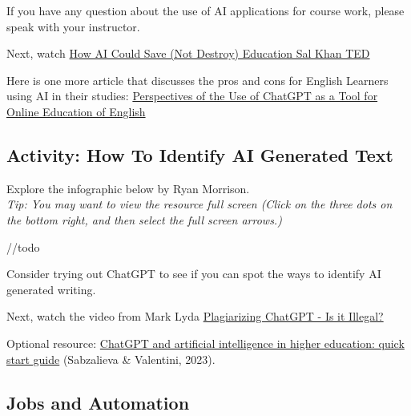 \documentclass[
]{book}
\theoremstyle{definition}
\theoremstyle{definition}
\theoremstyle{definition}
\theoremstyle{definition}
\theoremstyle{remark}
\begin{document}
\begin{reflect}
If you have any question about the use of AI applications for course work, please speak with your instructor.

Next, watch \href{https://www.youtube.com/watch?v=hJP5GqnTrNo}{How AI Could Save (Not Destroy) Education \textbar{} Sal Khan \textbar{} TED}

Here is one more article that discusses the pros and cons for English Learners using AI in their studies: \href{https://www.researchgate.net/publication/374483468_Perspectives_of_the_Use_of_ChatGPT_as_a_Tool_for_Online_Education_of_English}{Perspectives of the Use of ChatGPT as a Tool for Online Education of English}
\end{reflect}

\hypertarget{activity-how-to-identify-ai-generated-text}{%
\subsection*{Activity: How To Identify AI Generated Text}\label{activity-how-to-identify-ai-generated-text}}

\begin{reflect}
Explore the infographic below by Ryan Morrison.\\
\emph{Tip: You may want to view the resource full screen (Click on the three dots on the bottom right, and then select the full screen arrows.)}

//todo

Consider trying out ChatGPT to see if you can spot the ways to identify AI generated writing.

Next, watch the video from Mark Lyda \href{https://www.youtube.com/watch?v=zuvN8_6QIKk}{Plagiarizing ChatGPT - Is it Illegal?}

Optional resource: \href{https://www.iesalc.unesco.org/wp-content/uploads/2023/04/ChatGPT-and-Artificial-Intelligence-in-higher-education-Quick-Start-guide_EN_FINAL.pdf}{ChatGPT and artificial intelligence in higher education: quick start guide} (Sabzalieva \& Valentini, 2023).
\end{reflect}

\hypertarget{jobs-and-automation}{%
\subsection*{Jobs and Automation}\label{jobs-and-automation}}
\end{document}
